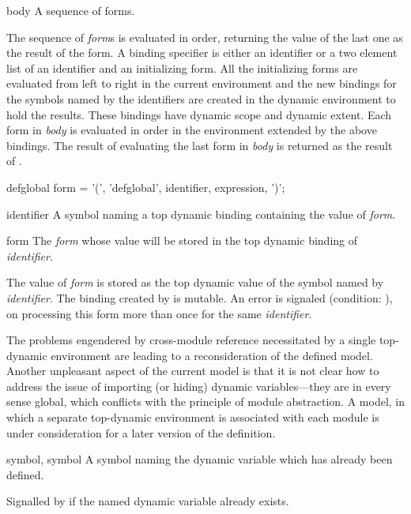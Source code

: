 \begin{optDefinition}
\begin{arguments}
    \item[body] A sequence of forms.
\end{arguments}
%
\result%
The sequence of {\em form}s is evaluated in order, returning the value of the
last one as the result of the  form.
%
\remarks%
A binding specifier is either an identifier or a two element list of an
identifier and an initializing form.  All the initializing forms are evaluated
from left to right in the current environment and the new bindings for the
symbols named by the identifiers are created in the dynamic environment to hold
the results.  These bindings have dynamic scope and dynamic
extent.
Each form in {\em body} is evaluated in order in the environment extended by the
above bindings.  The result of evaluating the last form in {\em body} is
returned as the result of .

%
\Syntax
\savesyntax{}\vbox{\syntax
defglobal form
   = '(', 'defglobal', identifier, expression, ')';
\endsyntax}
%
\begin{arguments}
    \item[identifier] A symbol naming a top dynamic binding containing the value
    of {\em form}.

    \item[form] The {\em form} whose value will be stored in the top dynamic
    binding of {\em identifier}.
\end{arguments}
%
\remarks%
The value of {\em form} is stored as the top dynamic value of the symbol named
by {\em identifier}.  The binding created by
 is mutable.  An error is signaled (condition:
),
on processing this form more than once for the same {\em identifier}.
%
\begin{note}
    The problems engendered by cross-module reference necessitated by a single
    top-dynamic environment are leading to a reconsideration of the defined
    model.  Another unpleasant aspect of the current model is that it is not
    clear how to address the issue of importing (or hiding) dynamic
    variables---they are in every sense global, which conflicts with the
    principle of module abstraction.  A model, in which a separate top-dynamic
    environment is associated with each module is under consideration for a
    later version of the definition.
\end{note}

%
\begin{initoptions}
    \item[symbol, symbol] A symbol naming the dynamic variable which has already
    been defined.
\end{initoptions}
%
\remarks%
Signalled by  if the named dynamic variable already
exists.
\end{optDefinition}


